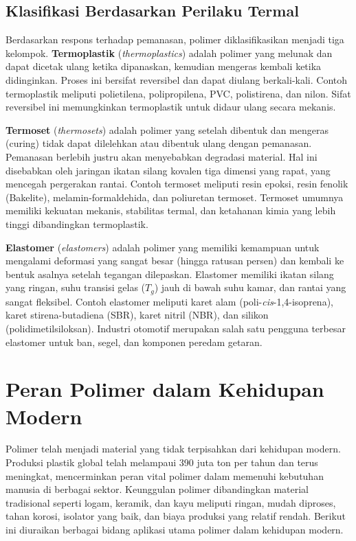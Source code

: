 \documentclass[12pt,a4paper,openany]{book}
\begin{document}
\subsection{Klasifikasi Berdasarkan Perilaku Termal}

Berdasarkan respons terhadap pemanasan, polimer diklasifikasikan menjadi tiga kelompok. \textbf{Termoplastik} (\textit{thermoplastics}) adalah polimer yang melunak dan dapat dicetak ulang ketika dipanaskan, kemudian mengeras kembali ketika didinginkan. Proses ini bersifat reversibel dan dapat diulang berkali-kali. Contoh termoplastik meliputi polietilena, polipropilena, PVC, polistirena, dan nilon. Sifat reversibel ini memungkinkan termoplastik untuk didaur ulang secara mekanis.

\textbf{Termoset} (\textit{thermosets}) adalah polimer yang setelah dibentuk dan mengeras (curing) tidak dapat dilelehkan atau dibentuk ulang dengan pemanasan. Pemanasan berlebih justru akan menyebabkan degradasi material. Hal ini disebabkan oleh jaringan ikatan silang kovalen tiga dimensi yang rapat, yang mencegah pergerakan rantai. Contoh termoset meliputi resin epoksi, resin fenolik (Bakelite), melamin-formaldehida, dan poliuretan termoset. Termoset umumnya memiliki kekuatan mekanis, stabilitas termal, dan ketahanan kimia yang lebih tinggi dibandingkan termoplastik.

\textbf{Elastomer} (\textit{elastomers}) adalah polimer yang memiliki kemampuan untuk mengalami deformasi yang sangat besar (hingga ratusan persen) dan kembali ke bentuk asalnya setelah tegangan dilepaskan. Elastomer memiliki ikatan silang yang ringan, suhu transisi gelas ($T_g$) jauh di bawah suhu kamar, dan rantai yang sangat fleksibel. Contoh elastomer meliputi karet alam (poli-\textit{cis}-1,4-isoprena), karet stirena-butadiena (SBR), karet nitril (NBR), dan silikon (polidimetilsiloksan). Industri otomotif merupakan salah satu pengguna terbesar elastomer untuk ban, segel, dan komponen peredam getaran.


\section{Peran Polimer dalam Kehidupan Modern}

Polimer telah menjadi material yang tidak terpisahkan dari kehidupan modern. Produksi plastik global telah melampaui 390 juta ton per tahun dan terus meningkat, mencerminkan peran vital polimer dalam memenuhi kebutuhan manusia di berbagai sektor. Keunggulan polimer dibandingkan material tradisional seperti logam, keramik, dan kayu meliputi ringan, mudah diproses, tahan korosi, isolator yang baik, dan biaya produksi yang relatif rendah. Berikut ini diuraikan berbagai bidang aplikasi utama polimer dalam kehidupan modern.
\end{document}

